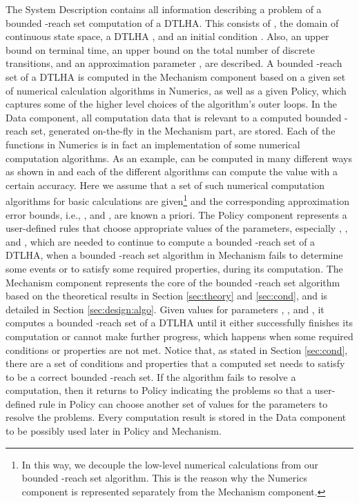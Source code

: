 The System Description contains all information describing a problem of a bounded -reach set computation of a DTLHA.
This consists of , the domain of continuous state space, a DTLHA , and an initial condition . 
Also, an upper bound  on terminal time, an upper bound  on the total number of discrete transitions, and an approximation parameter , are described.
A bounded -reach set of a DTLHA  is computed in the Mechanism component based on a given set of numerical calculation algorithms in Numerics, as well as a given Policy, which captures some of the higher level choices of the algorithm's outer loops. 
In the Data component, all computation data that is relevant to a computed bounded -reach set, generated on-the-fly in the Mechanism part, are stored. 
Each of the functions in Numerics is in fact an implementation of some numerical computation algorithms.  
As an example,  can be computed in many different ways as shown in \cite{moler:78} and each of the different algorithms can compute the value with a certain accuracy. 
Here we assume that a set of such numerical computation algorithms for basic calculations are given\footnote{In this way, we decouple the low-level numerical calculations from our bounded -reach set algorithm. This is the reason why the Numerics component is represented separately from the Mechanism component.} 
and the corresponding approximation error bounds, i.e., , and , are known a priori.
The Policy component represents a user-defined rules that choose appropriate values of the parameters, especially , , and , which are needed to continue to compute a bounded -reach set of a DTLHA, when a bounded -reach set algorithm in Mechanism fails to determine some events or to satisfy some required properties, during its computation.
The Mechanism component represents the core of the bounded -reach set algorithm based on the theoretical results in Section \ref{sec:theory} and \ref{sec:cond}, and is detailed in Section \ref{sec:design:algo}. 
Given values for parameters , , and , it computes a bounded -reach set of a DTLHA  until it either successfully finishes its computation or cannot make further progress, which happens when some required conditions or properties are not met.
Notice that,  as stated in Section \ref{sec:cond}, there are a set of conditions and properties that a computed set needs to satisfy to be a correct bounded -reach set.
If the algorithm fails to resolve a computation, then it returns to Policy indicating the problems so that a user-defined rule in Policy can choose another set of values for the parameters to resolve the problems.
Every computation result is stored in the Data component to be possibly used later in Policy and Mechanism.




